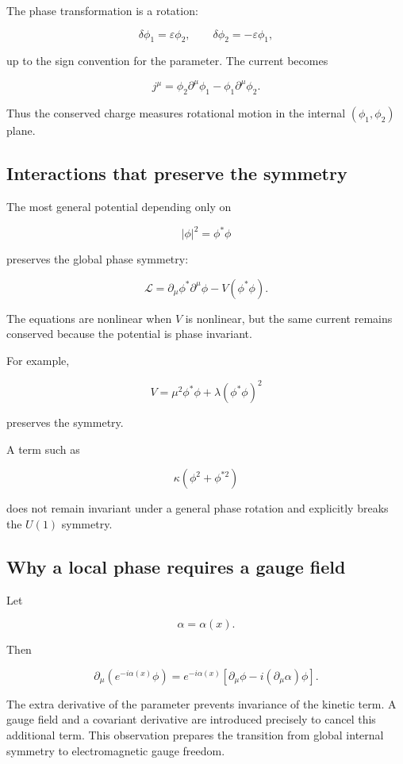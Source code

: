 The phase transformation is a rotation:

\[
\delta\phi_1
=
\varepsilon\phi_2,
\qquad
\delta\phi_2
=
-\varepsilon\phi_1,
\]

up to the sign convention for the parameter. The current becomes

\[
\boxed{
j^{\mu}
=
\phi_2\partial^{\mu}\phi_1
-
\phi_1\partial^{\mu}\phi_2
}.
\]

Thus the conserved charge measures rotational motion in the internal \((\phi_1,\phi_2)\) plane.

\subsection{Interactions that preserve the symmetry}

The most general potential depending only on

\[
|\phi|^{2}
=
\phi^{*}\phi
\]

preserves the global phase symmetry:

\[
\mathcal{L}
=
\partial_{\mu}\phi^{*}
\partial^{\mu}\phi
-
V(\phi^{*}\phi).
\]

The equations are nonlinear when \(V\) is nonlinear, but the same current remains conserved because the potential is phase invariant.

For example,

\[
V
=
\mu^{2}\phi^{*}\phi
+
\lambda
\left(
\phi^{*}\phi
\right)^{2}
\]

preserves the symmetry.

A term such as

\[
\kappa
\left(
\phi^{2}+\phi^{*2}
\right)
\]

does not remain invariant under a general phase rotation and explicitly breaks the \(U(1)\) symmetry.

\subsection{Why a local phase requires a gauge field}

Let

\[
\alpha=\alpha(x).
\]

Then

\[
\partial_{\mu}
\left(
e^{-i\alpha(x)}\phi
\right)
=
e^{-i\alpha(x)}
\left[
\partial_{\mu}\phi
-
i
(\partial_{\mu}\alpha)\phi
\right].
\]

The extra derivative of the parameter prevents invariance of the kinetic term. A gauge field and a covariant derivative are introduced precisely to cancel this additional term. This observation prepares the transition from global internal symmetry to electromagnetic gauge freedom.

